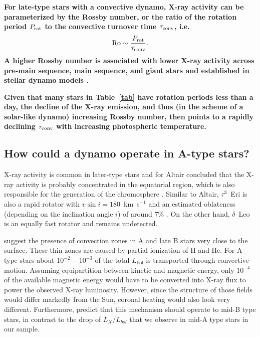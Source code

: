 \documentclass[preprint2]{aastex631}
\begin{document}
\textbf{For late-type stars with a convective dynamo, X-ray activity can be parameterized by the Rossby number, or the ratio of the rotation period $P_{\rm rot}$ to the convective turnover time $\tau_{\rm conv}$, i.e.
\begin{equation}
{\rm Ro} \sim \frac{P_{\rm rot}}{\tau_{\rm conv}}. \label{eqn:ro}
\end{equation}
A higher Rossby number is associated with lower X-ray activity across pre-main sequence, main sequence, and giant stars \citep{Preibisch+2005, Pizzolato+2003, Gondoin+2005,2011ApJ...743...48W} and established in stellar dynamo models \citep[e.g.][]{Brandenburg+1998}.}

\textbf{Given that many stars in Table~\ref{tab} have rotation periods less than a day, the decline of the X-ray emission, and thus (in the scheme of a solar-like dynamo) increasing Rossby number, then points to a rapidly declining $\tau_{\rm conv}$ with increasing photospheric temperature.} 


\subsection{How could a dynamo operate in A-type stars?}
\label{sect:dynamos}

X-ray activity is common in later-type stars and for Altair
\citet{2009A&A...497..511R} concluded that the X-ray activity is
probably concentrated in the equatorial region, which is also
responsible for the generation of the chromosphere
\citep{1995ApJ...439.1011F}. Similar to Altair, $\tau^3$~Eri is also a
rapid rotator with $v\sin i=180$~km~s$^{-1}$ and an estimated oblateness
(depending on the inclination angle $i$) of around 7\%
\citep{2012A&ARv..20...51V}. On the other hand, $\delta$~Leo is an
equally fast rotator and remains undetected.

\citet{2019ApJ...883..106C} suggest the presence of 
convection zones in A and late B stars very close to the surface. These thin zones are caused
by partial ionization of H and He. For A-type stars about $10^{-2}-10^{-3}$ of the total $L_\mathrm{bol}$ is transported through convective motion. Assuming equipartition between kinetic and magnetic energy, only $10^{-4}$ of the available magnetic energy would have to be converted into X-ray flux to power the observed X-ray luminosity. However, since the structure of those fields would differ markedly from the Sun, coronal heating would also look very different. Furthermore, \citet{2019ApJ...883..106C} predict that this mechanism should operate to mid-B type stars, in contrast to the drop of $L_X$/$L_{bol}$ that we observe in mid-A type stars in our sample.
\end{document}
